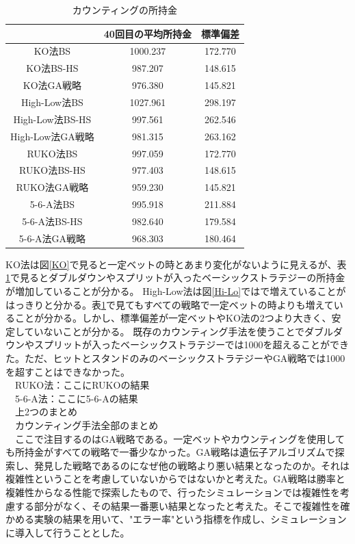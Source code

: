 \begin{table}[H]
 \caption{カウンティングの所持金\label{countting}}
 \begin{center}
  \begin{tabular}{|c|c|c|}
  \hline  & 40回目の平均所持金 & 標準偏差 \\
  \hline KO法BS & 1000.237 & 172.770\\
  \hline KO法BS-HS & 987.207 & 148.615 \\
  \hline KO法GA戦略 & 976.380 & 145.821\\
  \hline High-Low法BS & 1027.961 & 298.197\\
  \hline High-Low法BS-HS  & 997.561 & 262.546\\
  \hline High-Low法GA戦略 & 981.315 & 263.162\\
  \hline RUKO法BS & 997.059 & 172.770\\
  \hline RUKO法BS-HS & 977.403 & 148.615 \\
  \hline RUKO法GA戦略 & 959.230 & 145.821\\
  \hline 5-6-A法BS & 995.918 & 211.884\\
  \hline 5-6-A法BS-HS & 982.640 & 179.584 \\
  \hline 5-6-A法GA戦略 & 968.303 & 180.464\\
  \hline
  \end{tabular}
 \end{center}
\end{table}

KO法は図\ref{KO}で見ると一定ベットの時とあまり変化がないように見えるが、表\ref{countting}で見るとダブルダウンやスプリットが入ったベーシックストラテジーの所持金が増加していることが分かる。
 High-Low法は図\ref{Hi-Lo}ではで増えていることがはっきりと分かる。表\ref{countting}で見てもすべての戦略で一定ベットの時よりも増えていることが分かる。しかし、標準偏差が一定ベットやKO法の2つより大きく、安定していないことが分かる。
 既存のカウンティング手法を使うことでダブルダウンやスプリットが入ったベーシックストラテジーでは1000を超えることができた。ただ、ヒットとスタンドのみのベーシックストラテジーやGA戦略では1000を超すことはできなかった。\\
　RUKO法：ここにRUKOの結果\\
　5-6-A法：ここに5-6-Aの結果\\
　上2つのまとめ\\
　カウンティング手法全部のまとめ\\
　ここで注目するのはGA戦略である。一定ベットやカウンティングを使用しても所持金がすべての戦略で一番少なかった。GA戦略は遺伝子アルゴリズムで探索し、発見した戦略であるのになぜ他の戦略より悪い結果となったのか。それは複雑性ということを考慮していないからではないかと考えた。GA戦略は勝率と複雑性からなる性能で探索したもので、行ったシミュレーションでは複雑性を考慮する部分がなく、その結果一番悪い結果となったと考えた。そこで複雑性を確かめる実験の結果を用いて、"エラー率"という指標を作成し、シミュレーションに導入して行うこととした。

